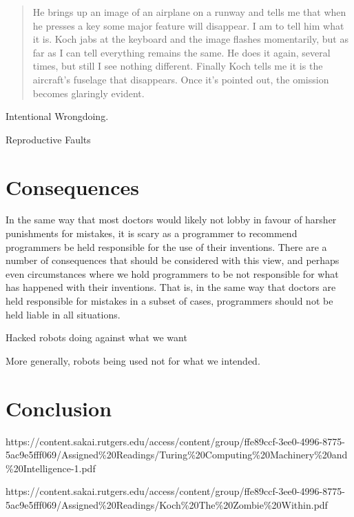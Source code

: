 \documentclass[12]{article}
\begin{document}
	\begin{quote}
		He brings up an image of an airplane on a runway and tells me that when he presses a key some major feature will disappear. I am to tell him what it is. Koch jabs at the keyboard and the image flashes momentarily, but as far as I can tell everything remains the same. He does it again, several times, but still I see nothing different. Finally Koch tells me it is the aircraft’s fuselage that disappears. Once it’s pointed out, the omission becomes glaringly evident.\cite{zombie_within}
	\end{quote}
		
	Intentional Wrongdoing.		

	Reproductive Faults

\section{Consequences}
	In the same way that most doctors would likely not lobby in favour of harsher punishments for mistakes, it is scary as a programmer to recommend programmers be held responsible for the use of their inventions. There are a number of consequences that should be considered with this view, and perhaps even circumstances where we hold programmers to be not responsible for what has happened with their inventions. That is, in the same way that doctors are held responsible for mistakes in a subset of cases, programmers should not be held liable in all situations.
	
	Hacked robots doing against what we want
	
	More generally, robots being used not for what we intended.	

\section{Conclusion}

\newpage

\begin{thebibliography}{6}

https://content.sakai.rutgers.edu/access/content/group/ffe89ccf-3ee0-4996-8775-5ac9e5fff069/Assigned\%20Readings/Turing\%20Computing\%20Machinery\%20and\%20Intelligence-1.pdf

https://content.sakai.rutgers.edu/access/content/group/ffe89ccf-3ee0-4996-8775-5ac9e5fff069/Assigned\%20Readings/Koch\%20The\%20Zombie\%20Within.pdf

\end{thebibliography}
\end{document}

